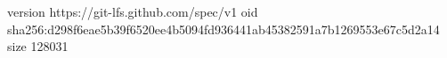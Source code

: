 version https://git-lfs.github.com/spec/v1
oid sha256:d298f6eae5b39f6520ee4b5094fd936441ab45382591a7b1269553e67c5d2a14
size 128031
